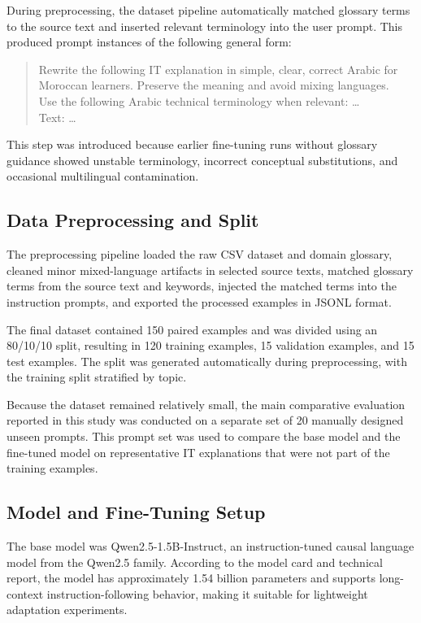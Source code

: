 \documentclass[education,article,submit,moreauthors]{Definitions/mdpi}
\begin{document}
During preprocessing, the dataset pipeline automatically matched glossary terms to the source text and inserted relevant terminology into the user prompt. This produced prompt instances of the following general form:

\begin{quote}
Rewrite the following IT explanation in simple, clear, correct Arabic for Moroccan learners. Preserve the meaning and avoid mixing languages.\\
Use the following Arabic technical terminology when relevant: \ldots\\
Text: \ldots
\end{quote}

This step was introduced because earlier fine-tuning runs without glossary guidance showed unstable terminology, incorrect conceptual substitutions, and occasional multilingual contamination.

\subsection{Data Preprocessing and Split}

The preprocessing pipeline loaded the raw CSV dataset and domain glossary, cleaned minor mixed-language artifacts in selected source texts, matched glossary terms from the source text and keywords, injected the matched terms into the instruction prompts, and exported the processed examples in JSONL format.

The final dataset contained 150 paired examples and was divided using an 80/10/10 split, resulting in 120 training examples, 15 validation examples, and 15 test examples. The split was generated automatically during preprocessing, with the training split stratified by topic.

Because the dataset remained relatively small, the main comparative evaluation reported in this study was conducted on a separate set of 20 manually designed unseen prompts. This prompt set was used to compare the base model and the fine-tuned model on representative IT explanations that were not part of the training examples.

\subsection{Model and Fine-Tuning Setup}

The base model was Qwen2.5-1.5B-Instruct, an instruction-tuned causal language model from the Qwen2.5 family. According to the model card and technical report, the model has approximately 1.54 billion parameters and supports long-context instruction-following behavior, making it suitable for lightweight adaptation experiments.
\end{document}
